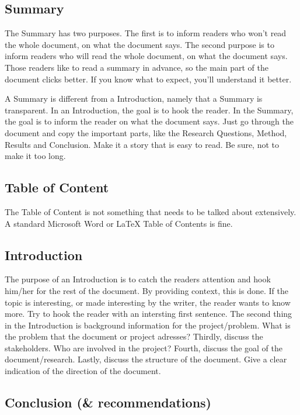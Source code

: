 \documentclass[10pt]{report}
\begin{document}
\subsection{Summary}

The Summary has two purposes. The first is to inform readers who won't read the whole document, on what the document says. The second purpose is to inform readers who will read the whole document, on what the document says. Those readers like to read a summary in advance, so the main part of the document clicks better. If you know what to expect, you'll understand it better. 

\bigskip

A Summary is different from a Introduction, namely that a Summary is transparent. In an Introduction, the goal is to hook the reader. In the Summary, the goal is to inform the reader on what the document says. Just go through the document and copy the important parts, like the Research Questions, Method, Results and Conclusion. Make it a story that is easy to read. Be sure, not to make it too long. 

\subsection{Table of Content}

The Table of Content is not something that needs to be talked about extensively. A standard Microsoft Word or LaTeX Table of Contents is fine.

\subsection{Introduction}

The purpose of an Introduction is to catch the readers attention and hook him/her for the rest of the document. By providing context, this is done. If the topic is interesting, or made interesting by the writer, the reader wants to know more. Try to hook the reader with an intersting first sentence. The second thing in the Introduction is background information for the project/problem. What is the problem that the document or project adresses? Thirdly, discuss the stakeholders. Who are involved in the project? Fourth, discuss the goal of the document/research. Lastly, discuss the structure of the document. Give a clear indication of the direction of the document. 

\subsection{Conclusion (\& recommendations)}
\end{document}
